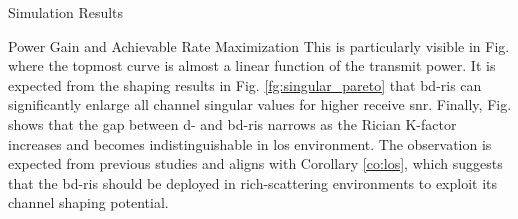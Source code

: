 \begin{section}{Simulation Results}
\begin{subsection}{Power Gain and Achievable Rate Maximization}
	 This is particularly visible in Fig.  where the topmost curve is almost a linear function of the transmit power.
	 It is expected from the shaping results in Fig. \ref{fg:singular_pareto} that \gls{bd}-\gls{ris} can significantly enlarge all channel singular values for higher receive \gls{snr}.
	 Finally, Fig.  shows that the gap between \gls{d}- and \gls{bd}-\gls{ris} narrows as the Rician K-factor increases and becomes indistinguishable in \gls{los} environment.
	 The observation is expected from previous studies \cite{Shen2020a,Li2023b,Nerini2023} and aligns with Corollary \ref{co:los}, which suggests that the \gls{bd}-\gls{ris} should be deployed in rich-scattering environments to exploit its channel shaping potential.
 \end{subsection}
\end{section}

